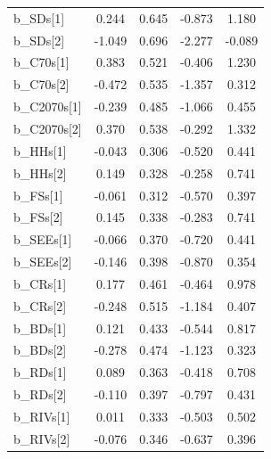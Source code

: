\documentclass[12pt,]{article}
\begin{document}
\begin{table}[]
\begin{tabular}{lcccc}
b\_SDs{[}1{]}    & 0.244  & 0.645 & -0.873 & 1.180   \\
b\_SDs{[}2{]}    & -1.049 & 0.696 & -2.277 & -0.089  \\
b\_C70s{[}1{]}   & 0.383  & 0.521 & -0.406 & 1.230   \\
b\_C70s{[}2{]}   & -0.472 & 0.535 & -1.357 & 0.312   \\
b\_C2070s{[}1{]} & -0.239 & 0.485 & -1.066 & 0.455   \\
b\_C2070s{[}2{]} & 0.370  & 0.538 & -0.292 & 1.332   \\
b\_HHs{[}1{]}    & -0.043 & 0.306 & -0.520 & 0.441   \\
b\_HHs{[}2{]}    & 0.149  & 0.328 & -0.258 & 0.741   \\
b\_FSs{[}1{]}    & -0.061 & 0.312 & -0.570 & 0.397   \\
b\_FSs{[}2{]}    & 0.145  & 0.338 & -0.283 & 0.741   \\
b\_SEEs{[}1{]}   & -0.066 & 0.370 & -0.720 & 0.441   \\
b\_SEEs{[}2{]}   & -0.146 & 0.398 & -0.870 & 0.354   \\
b\_CRs{[}1{]}    & 0.177  & 0.461 & -0.464 & 0.978   \\
b\_CRs{[}2{]}    & -0.248 & 0.515 & -1.184 & 0.407   \\
b\_BDs{[}1{]}    & 0.121  & 0.433 & -0.544 & 0.817   \\
b\_BDs{[}2{]}    & -0.278 & 0.474 & -1.123 & 0.323   \\
b\_RDs{[}1{]}    & 0.089  & 0.363 & -0.418 & 0.708   \\
b\_RDs{[}2{]}    & -0.110 & 0.397 & -0.797 & 0.431   \\
b\_RIVs{[}1{]}   & 0.011  & 0.333 & -0.503 & 0.502   \\
b\_RIVs{[}2{]}   & -0.076 & 0.346 & -0.637 & 0.396   \\ \hline
\end{tabular}

\label{tab:coefLivestockdamage}
\end{table}
\end{document}
